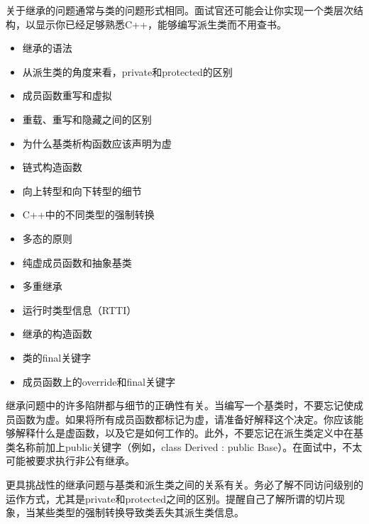 
关于继承的问题通常与类的问题形式相同。面试官还可能会让你实现一个类层次结构，以显示你已经足够熟悉C++，能够编写派生类而不用查书。


\begin{itemize}
\item
继承的语法

\item
从派生类的角度来看，private和protected的区别

\item
成员函数重写和虚拟

\item
重载、重写和隐藏之间的区别

\item
为什么基类析构函数应该声明为虚

\item
链式构造函数

\item
向上转型和向下转型的细节

\item
C++中的不同类型的强制转换

\item
多态的原则

\item
纯虚成员函数和抽象基类

\item
多重继承

\item
运行时类型信息（RTTI）

\item
继承的构造函数

\item
类的final关键字

\item
成员函数上的override和final关键字
\end{itemize}


继承问题中的许多陷阱都与细节的正确性有关。当编写一个基类时，不要忘记使成员函数为虚。如果将所有成员函数都标记为虚，请准备好解释这个决定。你应该能够解释什么是虚函数，以及它是如何工作的。此外，不要忘记在派生类定义中在基类名称前加上public关键字（例如，class Derived : public Base）。在面试中，不太可能被要求执行非公有继承。

更具挑战性的继承问题与基类和派生类之间的关系有关。务必了解不同访问级别的运作方式，尤其是private和protected之间的区别。提醒自己了解所谓的切片现象，当某些类型的强制转换导致类丢失其派生类信息。










